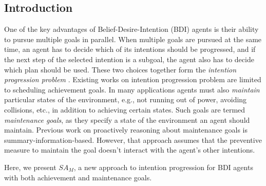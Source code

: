 \documentclass[a0,landscape]{a0poster}
\newcommand{\SAM}{\emph{$SA_M$}\xspace}
\begin{document}
\begin{multicols}{4} %





\section*{Introduction}
One of the key advantages of Belief-Desire-Intention (BDI) agents \cite{Rao/Georgeff:92a} is their ability to pursue multiple goals in parallel.
%
When multiple goals are pursued at the same time,  an agent has to decide which of its intentions should be progressed, and if the next step of the selected intention is a subgoal, the agent also has to decide which plan should be used. These two choices together form the \textit{intention progression problem} \cite{Logan//:17a}.
%
Existing works on intention progression problem are limited to scheduling achievement goals. In many applications agents must also \emph{maintain} particular states of the environment, e.g., not running out of power, avoiding collisions, etc., in addition to achieving certain states.
Such goals are termed \textit{maintenance goals}, as they specify a state of the environment an agent should maintain. 
Previous work \cite{DuffHT06} on proactively reasoning about maintenance goals is summary-information-based. However, that approach assumes that the preventive measure to maintain the goal doesn't interact with the agent's other intentions.

Here, we present \SAM, a new approach to intention progression for BDI agents with both achievement and maintenance goals.


\end{multicols}
\end{document}
